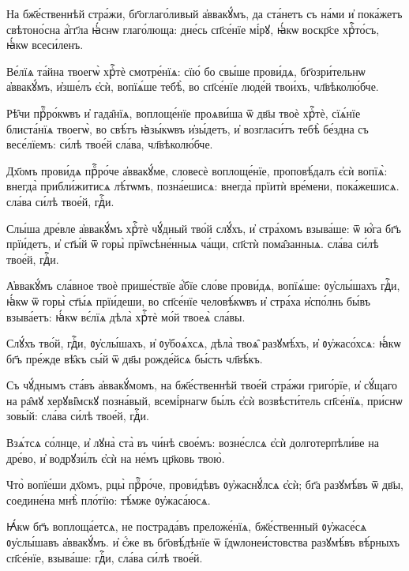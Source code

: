 \hKv На бж҃е́ственнѣй стра́жи, бг҃оглаго́ливый а҆ввакꙋ́мъ,  да ста́нетъ съ на́ми и҆ пока́жетъ свѣтоно́сна а҆́гг҃ла ꙗ҆́снѡ  глаго́люща: дне́сь сп҃се́нїе мі́рꙋ, ꙗ҆́кѡ воскр҃се хрⷭ҇то́съ, ꙗ҆́кѡ  всеси́ленъ. 
%

\hKv Ве́лїѧ та́йна твоегѡ̀ хрⷭ҇тѐ смотре́нїѧ: сїю́ бо свы́ше  прови́дѧ, бг҃озри́тельнѡ а҆ввакꙋ́мъ, и҆зше́лъ є҆сѝ, вопїѧ́ше  тебѣ̀, во сп҃се́нїе люде́й твои́хъ, чл҃вѣколю́бче. 
%

\hKv Рѣ̑чи прⷪ҇ро́кѡвъ и҆ гада̑нїѧ, воплоще́нїе  проѧви́ша ѿ дв҃ы твоѐ хрⷭ҇тѐ,  сїѧ́нїе  блиста́нїѧ твоегѡ̀, во свѣ́тъ ꙗ҆зы́кѡвъ и҆зы́детъ, и҆ возгласи́тъ  тебѣ̀ бе́здна съ весе́лїемъ: си́лѣ твое́й сла́ва, чл҃вѣколю́бче. 
%

\hKv Дх҃омъ прови́дѧ прⷪ҇ро́че а҆ввакꙋ́ме, словесѐ воплоще́нїе,  проповѣ́далъ є҆сѝ вопїѧ̀: внегда̀ прибли́житисѧ лѣ́тѡмъ,  позна́ешисѧ: внегда̀ прїитѝ вре́мени, пока́жешисѧ. сла́ва си́лѣ  твое́й, гдⷭ҇и. 

\hKv Слы́ша дре́вле а҆ввакꙋ́мъ хрⷭ҇тѐ чꙋ́дный тво́й слꙋ́хъ, и҆  стра́хомъ взыва́ше: ѿ ю҆́га бг҃ъ прїи́детъ, и҆ ст҃ы́й ѿ горы̀  прїѡсѣне́нныѧ ча́щи, сп҃стѝ пома̑занныѧ. сла́ва си́лѣ твое́й,  гдⷭ҇и. 

\hKv А҆ввакꙋ́мъ сла́вное твоѐ прише́ствїе а҆́бїе сло́ве прови́дѧ,  вопїѧ́ше: ᲂу҆слы́шахъ гдⷭ҇и, ꙗ҆́кѡ ѿ горы̀ ст҃ы́ѧ прїи́деши, во  сп҃се́нїе человѣ́кѡвъ и҆ стра́ха и҆спо́лнь бы́въ взыва́етъ: ꙗ҆́кѡ  вє́лїѧ дѣла̀ хрⷭ҇тѐ мо́й твоеѧ̀ сла́вы.  

\hKv Слꙋ́хъ тво́й, гдⷭ҇и, ᲂу҆слы́шахъ, и҆ ᲂу҆боѧ́хсѧ, дѣла̀ твоѧ̑  разꙋмѣ́хъ, и҆ ᲂу҆жасо́хсѧ: ꙗ҆́кѡ бг҃ъ пре́жде вѣ̑къ сы́й ѿ  дв҃ы рожде́йсѧ бы́сть чл҃вѣ́къ. 

\hKv Съ чꙋ́днымъ ста́въ а҆ввакꙋ́момъ, на бж҃е́ственнѣй твое́й стра́жи  григо́рїе, и҆ сꙋ́щаго на ра̑мꙋ херꙋві̑мскꙋ позна́вый, всемі́рнагѡ  бы́лъ є҆сѝ возвѣсти́тель сп҃се́нїѧ, при́снѡ зовы́й: сла́ва си́лѣ  твое́й, гдⷭ҇и. 

\hKv Взѧ́тсѧ со́лнце, и҆ лꙋна̀ ста̀ въ чи́нѣ свое́мъ: возне́слсѧ  є҆сѝ долготерпѣли́ве на дре́во, и҆ водрꙋзи́лъ є҆сѝ на не́мъ  цр҃ковь твою̀. 

\hKv Что̀ вопїе́ши дх҃омъ, рцы̀ прⷪ҇ро́че, прови́дѣвъ ᲂу҆жаснꙋ́лсѧ  є҆сѝ; бг҃а разꙋмѣ́въ ѿ дв҃ы, соедине́на мнѣ̀ пло́тїю: тѣ́мже  ᲂу҆жаса́юсѧ. 

\hKv Ꙗ҆́кѡ бг҃ъ воплоща́етсѧ, не пострада́въ преложе́нїѧ,  бж҃е́ственный ᲂу҆жасе́сѧ ᲂу҆слы́шавъ а҆ввакꙋ́мъ. и҆ є҆́же въ  бг҃овѣ́дѣнїе ѿ і҆дѡлонеи́стовства разꙋмѣ́въ вѣ́рныхъ сп҃се́нїе,  взыва́ше: гдⷭ҇и, сла́ва си́лѣ твое́й.  

